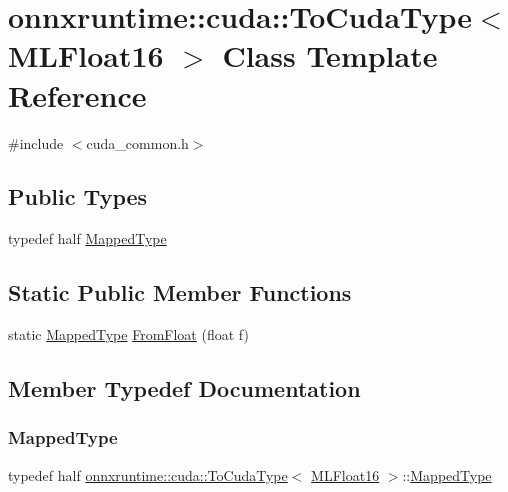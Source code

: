 \hypertarget{classonnxruntime_1_1cuda_1_1ToCudaType_3_01MLFloat16_01_4}{}\section{onnxruntime\+:\+:cuda\+:\+:To\+Cuda\+Type$<$ M\+L\+Float16 $>$ Class Template Reference}
\label{classonnxruntime_1_1cuda_1_1ToCudaType_3_01MLFloat16_01_4}


{\ttfamily \#include $<$cuda\+\_\+common.\+h$>$}

\subsection*{Public Types}
\begin{DoxyCompactItemize}
\item 
typedef half \mbox{\hyperlink{classonnxruntime_1_1cuda_1_1ToCudaType_3_01MLFloat16_01_4_a1c4be6f7df08b7f2f2f7d2ccb18cde81}{Mapped\+Type}}
\end{DoxyCompactItemize}
\subsection*{Static Public Member Functions}
\begin{DoxyCompactItemize}
\item 
static \mbox{\hyperlink{classonnxruntime_1_1cuda_1_1ToCudaType_3_01MLFloat16_01_4_a1c4be6f7df08b7f2f2f7d2ccb18cde81}{Mapped\+Type}} \mbox{\hyperlink{classonnxruntime_1_1cuda_1_1ToCudaType_3_01MLFloat16_01_4_a4dd3696c2b50dcac6f48065bd45e9acf}{From\+Float}} (float f)
\end{DoxyCompactItemize}


\subsection{Member Typedef Documentation}
\mbox{\label{classonnxruntime_1_1cuda_1_1ToCudaType_3_01MLFloat16_01_4_a1c4be6f7df08b7f2f2f7d2ccb18cde81}} 
\subsubsection{\texorpdfstring{Mapped\+Type}{MappedType}}
{\footnotesize\ttfamily typedef half \mbox{\hyperlink{classonnxruntime_1_1cuda_1_1ToCudaType}{onnxruntime\+::cuda\+::\+To\+Cuda\+Type}}$<$ \mbox{\hyperlink{uniononnxruntime_1_1MLFloat16}{M\+L\+Float16}} $>$\+::\mbox{\hyperlink{classonnxruntime_1_1cuda_1_1ToCudaType_3_01MLFloat16_01_4_a1c4be6f7df08b7f2f2f7d2ccb18cde81}{Mapped\+Type}}}



